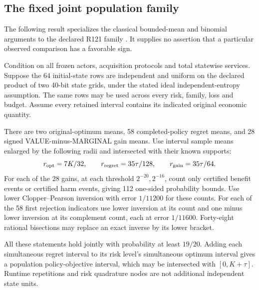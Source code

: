 \subsection{The fixed joint population family}
\label{supp:inference121}

The following result specializes the
classical bounded-mean and binomial
arguments to the declared R121 family
\citep{hoeffding1963,clopperpearson1934}.
It supplies no assertion that a
particular observed comparison has
a favorable sign.

\begin{proposition}
\label{prop:jointinference121}
Condition on all frozen actors,
acquisition protocols and total
statewise services.  Suppose the
64 initial-state rows are independent
and uniform on the declared product
of two 40-bit state grids, under the
stated ideal independent-entropy
assumption.  The same rows may be
used across every risk, family,
loss and budget.
Assume every retained interval
contains its indicated original
economic quantity.

There are two original-optimum
means, 58 completed-policy regret
means, and 28 signed
VALUE-minus-MARGINAL gain means.
Use interval sample means enlarged
by the following radii and
intersected with their known supports:
\[
 r_{\rm opt}=7K/32,\qquad
 r_{\rm regret}=35\tau/128,\qquad
 r_{\rm gain}=35\tau/64 .
\]
For each of the 28 gains, at each
threshold \(2^{-20},2^{-16}\),
count only certified benefit events
or certified harm events, giving
112 one-sided probability bounds.
Use lower Clopper--Pearson inversion
with error \(1/11200\) for these
counts.  For each of the 58 first
rejection indicators use lower
inversion at its count and one
minus lower inversion at its
complement count, each at error
\(1/11600\).
Forty-eight rational bisections
may replace an exact inverse by
its lower bracket.

All these statements hold jointly
with probability at least \(19/20\).
Adding each simultaneous regret
interval to its risk level's
simultaneous optimum interval
gives a population policy-objective
interval, which may be intersected
with \([0,K+\tau]\).
Runtime repetitions and risk
quadrature nodes are not additional
independent state units.
\end{proposition}

